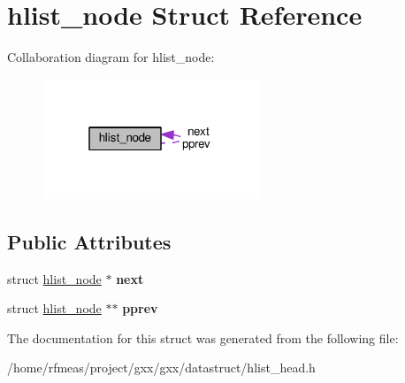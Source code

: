 \hypertarget{structhlist__node}{}\section{hlist\+\_\+node Struct Reference}
\label{structhlist__node}


Collaboration diagram for hlist\+\_\+node\+:
\nopagebreak
\begin{figure}[H]
\begin{center}
\leavevmode
\includegraphics[width=184pt]{structhlist__node__coll__graph}
\end{center}
\end{figure}
\subsection*{Public Attributes}
\begin{DoxyCompactItemize}
\item 
struct \hyperlink{structhlist__node}{hlist\+\_\+node} $\ast$ {\bfseries next}\hypertarget{structhlist__node_a915ba19b2ab3aa3f092edc8d5ed98c27}{}\label{structhlist__node_a915ba19b2ab3aa3f092edc8d5ed98c27}

\item 
struct \hyperlink{structhlist__node}{hlist\+\_\+node} $\ast$$\ast$ {\bfseries pprev}\hypertarget{structhlist__node_a4c25bc97aba8b77ee499b519df1cee43}{}\label{structhlist__node_a4c25bc97aba8b77ee499b519df1cee43}

\end{DoxyCompactItemize}


The documentation for this struct was generated from the following file\+:\begin{DoxyCompactItemize}
\item 
/home/rfmeas/project/gxx/gxx/datastruct/hlist\+\_\+head.\+h\end{DoxyCompactItemize}
